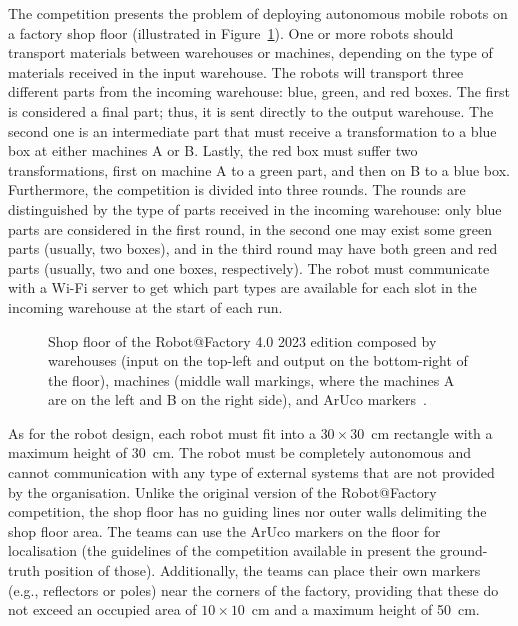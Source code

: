\documentclass[conference]{IEEEtran}
\begin{document}
The competition presents the problem of deploying autonomous mobile robots on a factory shop floor (illustrated in Figure~\ref{fig:ratf:track-2023}).
One or more robots should transport materials between warehouses or machines, depending on the type of materials received in the input warehouse.
The robots will transport three different parts from the incoming warehouse: blue, green, and red boxes.
The first is considered a final part; thus, it is sent directly to the output warehouse.
The second one is an intermediate part that must receive a transformation to a blue box at either machines A or B.
Lastly, the red box must suffer two transformations, first on machine A to a green part, and then on B to a blue box.
Furthermore, the competition is divided into three rounds. The rounds are distinguished by the type of parts received in the incoming warehouse: only blue parts are considered in the first round, in the second one may exist some green parts (usually, two boxes), and in the third round may have both green and red parts (usually, two and one boxes, respectively).
The robot must communicate with a Wi-Fi server to get which part types are available for each slot in the incoming warehouse at the start of each run.

\begin{figure}[!t]
\centering
\centerline{}
\caption[Shop floor of the Robot@Factory 4.0 2023 edition composed by warehouses (input on the top-left and output on the bottom-right of the floor), machines (middle wall markings, where the machines A are on the left and B on the right side), and ArUco markers.]{Shop floor of the Robot@Factory 4.0 2023 edition composed by warehouses (input on the top-left and output on the bottom-right of the floor), machines (middle wall markings, where the machines A are on the left and B on the right side), and ArUco markers~\cite{ratf:github-repo}.}
\label{fig:ratf:track-2023}
\end{figure}

As for the robot design, each robot must fit into a $30\times30$~cm rectangle with a maximum height of 30~cm.
The robot must be completely autonomous and cannot communication with any type of external systems that are not provided by the organisation.
Unlike the original version of the Robot@Factory competition, the shop floor has no guiding lines nor outer walls delimiting the shop floor area.
The teams can use the ArUco markers on the floor for localisation (the guidelines of the competition available in \cite{ratf:github-repo} present the ground-truth position of those).
Additionally, the teams can place their own markers (e.g., reflectors or poles) near the corners of the factory, providing that these do not exceed an occupied area of $10\times 10$~cm and a maximum height of 50~cm.
\end{document}
